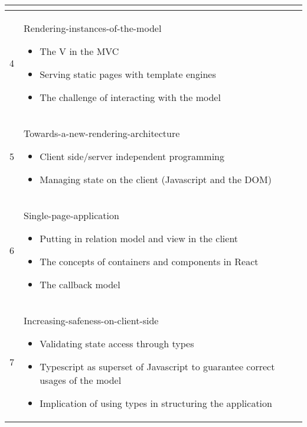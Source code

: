 \begin{tabular}{ | p{1.2cm} | p{10cm} | }
\begin{itemize}[nolistsep]
				\end{itemize}
  		 \\
  		\hline
  		4 &  Rendering-instances-of-the-model
  		\begin{itemize}[nolistsep]
					\item The V in the MVC
					\item Serving static pages with template engines
					\item The challenge of interacting with the model
				\end{itemize}
  		 \\
  		\hline
  		5 & Towards-a-new-rendering-architecture
  		\begin{itemize}[nolistsep]
					\item Client side/server independent programming
					\item Managing state on the client (Javascript and the DOM)
				\end{itemize}
  		 \\
  		\hline
  		6 & Single-page-application
  		\begin{itemize}[nolistsep]
				\item Putting in relation model and view in the client
				\item The concepts of containers and components in React
				\item The callback model
			\end{itemize}
			\\
  		\hline
  		7 & Increasing-safeness-on-client-side
  		\begin{itemize}[nolistsep]
				\item Validating state access through types
				\item Typescript as superset of Javascript to guarantee correct usages of the model
				\item Implication of using types in structuring the application
				\end{itemize} 
				\\
			\hline
	\end{tabular}
		
\begin{comment}
    A unit does not necessarily match with a lesson. Some subjects of a unit could be discussed in tow different lessons.
\end{comment}
\newpage
